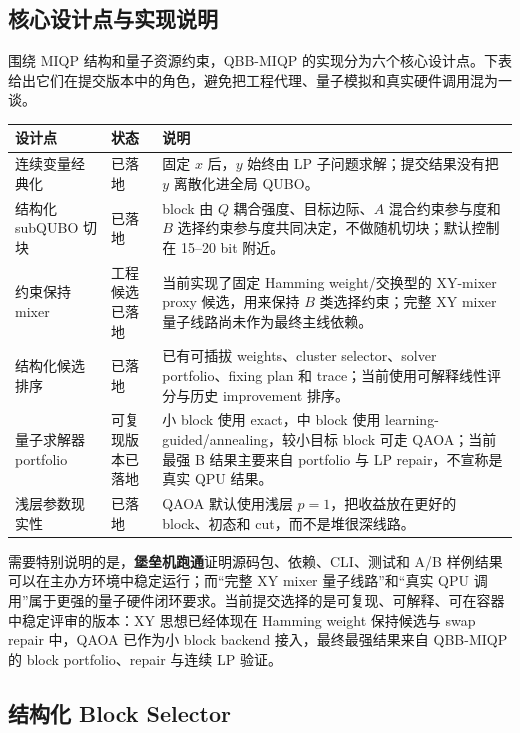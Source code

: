 \documentclass[UTF8,a4paper,11pt]{ctexart}
\begin{document}
\subsection{核心设计点与实现说明}

围绕 MIQP 结构和量子资源约束，QBB-MIQP 的实现分为六个核心设计点。下表给出它们在提交版本中的角色，避免把工程代理、量子模拟和真实硬件调用混为一谈。

\begin{center}
\small
\begin{tabular}{p{3.6cm}p{2.0cm}p{8.0cm}}
\toprule
设计点 & 状态 & 说明 \\
\midrule
连续变量经典化 & 已落地 & 固定 $x$ 后，$y$ 始终由 LP 子问题求解；提交结果没有把 $y$ 离散化进全局 QUBO。\\
结构化 subQUBO 切块 & 已落地 & block 由 $Q$ 耦合强度、目标边际、$A$ 混合约束参与度和 $B$ 选择约束参与度共同决定，不做随机切块；默认控制在 15--20 bit 附近。\\
约束保持 mixer & 工程候选已落地 & 当前实现了固定 Hamming weight/交换型的 XY-mixer proxy 候选，用来保持 $B$ 类选择约束；完整 XY mixer 量子线路尚未作为最终主线依赖。\\
结构化候选排序 & 已落地 & 已有可插拔 weights、cluster selector、solver portfolio、fixing plan 和 trace；当前使用可解释线性评分与历史 improvement 排序。\\
量子求解器 portfolio & 可复现版本已落地 & 小 block 使用 exact，中 block 使用 learning-guided/annealing，较小目标 block 可走 QAOA；当前最强 B 结果主要来自 portfolio 与 LP repair，不宣称是真实 QPU 结果。\\
浅层参数现实性 & 已落地 & QAOA 默认使用浅层 $p=1$，把收益放在更好的 block、初态和 cut，而不是堆很深线路。\\
\bottomrule
\end{tabular}
\end{center}

需要特别说明的是，\textbf{堡垒机跑通}证明源码包、依赖、CLI、测试和 A/B 样例结果可以在主办方环境中稳定运行；而“完整 XY mixer 量子线路”和“真实 QPU 调用”属于更强的量子硬件闭环要求。当前提交选择的是可复现、可解释、可在容器中稳定评审的版本：XY 思想已经体现在 Hamming weight 保持候选与 swap repair 中，QAOA 已作为小 block backend 接入，最终最强结果来自 QBB-MIQP 的 block portfolio、repair 与连续 LP 验证。

\subsection{结构化 Block Selector}
\end{document}
